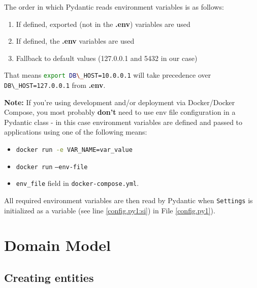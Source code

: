 \documentclass[14pt]{extarticle}
\newcommand{\note}{\textbf{\color{red}Note: }}
\newcommand{\pyinline}[1]{\lstinline[language=Python, style=cstyle, morekeywords={async}, basicstyle=\ttfamily\normalsize]{#1}}
\newcommand{\bashinline}[1]{\lstinline[language=bash, style=cstyle, morekeywords={docker, poetry, git, mv, python, uvicorn}, basicstyle=\ttfamily\normalsize]{#1}}
\begin{document}
The order in which Pydantic reads environment variables is as follows:

\begin{enumerate}
    \item If defined, exported (not in the \textbf{.env}) variables are used
    \item If defined, the \textbf{.env} variables are used
    \item Fallback to default values (127.0.0.1 and 5432 in our case)
\end{enumerate}

That means \bashinline{export DB\_HOST=10.0.0.1} will take precedence over \\\bashinline{DB\_HOST=127.0.0.1} from \textbf{.env}.

\note If you're using development and/or deployment via Docker/Docker Compose, you most probably \textbf{don't} need to use env file configuration in a Pydantic class - in this case environment variables are defined and passed to applications using one of the following means:

\begin{itemize}
    \item \bashinline{docker run -e VAR_NAME=var_value}
    \item \bashinline{docker run} \texttt{--env-file}
    \item \texttt{env\_file} field in \texttt{docker-compose.yml}.
\end{itemize}

All required environment variables are then read by Pydantic when \pyinline{Settings} is initialized as a variable (see line \ref{config.py1:si}) in File \ref{config.py1}).

\section{Domain Model}

\subsection{Creating entities}
\end{document}
